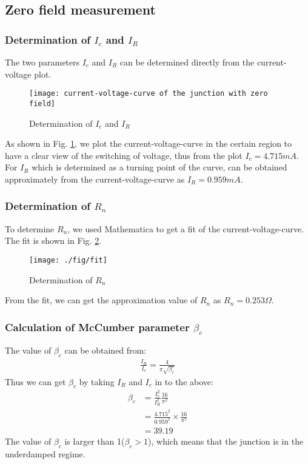 \subsection{Zero field measurement}

\subsubsection{Determination of $I_{c}$ and $I_{R}$}
The two parameters $I_{c}$ and $I_{R}$ can be determined directly from the current-voltage plot.


\begin{figure}[h]
\centering
\texttt{[image: current-voltage-curve of the junction with zero field]}
\caption{Determination of $I_{c}$ and $I_{R}$}
\label{UIcurvePicture}
\end{figure}


As shown in Fig. \ref{UIcurvePicture}, we plot the current-voltage-curve in the certain region to have a clear view of the switching of voltage,
thus from the plot $I_{c}=4.715mA$. For $I_{R}$ which is determined as a turning point of the curve, can be obtained approximately from the current-voltage-curve as $I_R=0.959mA$.
\subsubsection{Determination of $R_{n}$}
To determine $R_{n}$, we used Mathematica to get a fit of the current-voltage-curve. The fit is shown in Fig. \ref{determinationRNfigure}.

\begin{figure}[h]
\centering
\texttt{[image: ./fig/fit]}
\caption{Determination of $R_{n}$}
\label{determinationRNfigure}
\end{figure}


From the fit, we can get the approximation value of $R_{n}$ as $R_{n}=0.253\Omega$.

\subsubsection{Calculation of McCumber parameter $\beta_{c}$}
The value of $\beta_{c}$ can be obtained from:
\begin{align*}
\frac{I_{R}}{I_{c}}=\frac{4}{\pi\sqrt{\beta_{c}}}
\end{align*}
Thus we can get $\beta_{c}$ by taking $I_{R}$ and $I_{c}$ in to the above:
\begin{align*}
\beta_c & =\frac{I_{c}^2}{I_{R}^2}\frac{16}{\pi^2}\\
    & =\frac{4.715^2}{0.959^2}\times\frac{16}{\pi^2}\\
    & =39.19
\end{align*}
The value of $\beta_c$ is larger than 1($\beta_{c}>1$), which means that the junction is in the underdamped regime.

